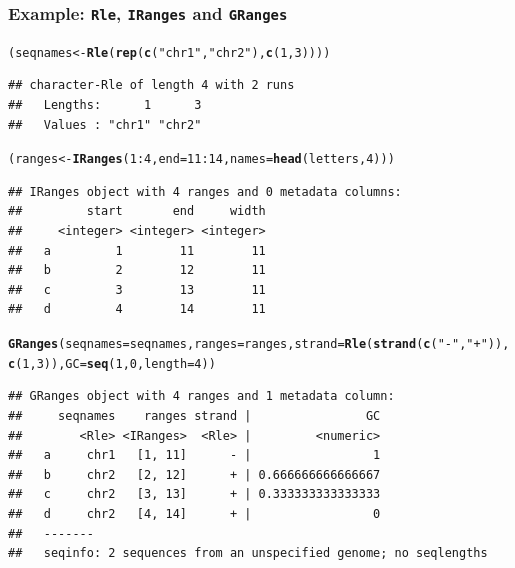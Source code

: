 \documentclass{beamer}\usepackage[]{graphicx}\usepackage[]{color}
\makeatletter
\newcommand{\hlnum}[1]{\textcolor[rgb]{0.686,0.059,0.569}{#1}}%
\newcommand{\hlstr}[1]{\textcolor[rgb]{0.192,0.494,0.8}{#1}}%
\newcommand{\hlopt}[1]{\textcolor[rgb]{0,0,0}{#1}}%
\newcommand{\hlstd}[1]{\textcolor[rgb]{0.345,0.345,0.345}{#1}}%
\newcommand{\hlkwb}[1]{\textcolor[rgb]{0.69,0.353,0.396}{#1}}%
\newcommand{\hlkwc}[1]{\textcolor[rgb]{0.333,0.667,0.333}{#1}}%
\newcommand{\hlkwd}[1]{\textcolor[rgb]{0.737,0.353,0.396}{\textbf{#1}}}%
\newenvironment{kframe}{%
 \def\at@end@of@kframe{}%
 \ifinner\ifhmode%
  \def\at@end@of@kframe{\end{minipage}}%
  \begin{minipage}{\columnwidth}%
 \fi\fi%
 \def\FrameCommand##1{\hskip\@totalleftmargin \hskip-\fboxsep
 \colorbox{shadecolor}{##1}\hskip-\fboxsep
     \hskip-\linewidth \hskip-\@totalleftmargin \hskip\columnwidth}%
 \MakeFramed {\advance\hsize-\width
   \@totalleftmargin\z@ \linewidth\hsize
   \@setminipage}}%
 {\par\unskip\endMakeFramed%
 \at@end@of@kframe}
\newenvironment{knitrout}{}{} %
\newcommand{\Rcode}[1]{\texttt{#1}}
\newcommand{\Robject}[1]{\Rcode{#1}}
\makeatother
\begin{document}
\begin{frame}[fragile]
  \frametitle{Example: \Robject{Rle}, \Robject{IRanges} and
    \Robject{GRanges}}
\begin{knitrout}\tiny
{}\color{fgcolor}\begin{kframe}
\begin{alltt}
\hlstd{(seqnames} \hlkwb{<-} \hlkwd{Rle}\hlstd{(}\hlkwd{rep}\hlstd{(}\hlkwd{c}\hlstd{(}\hlstr{"chr1"}\hlstd{,} \hlstr{"chr2"}\hlstd{),} \hlkwd{c}\hlstd{(}\hlnum{1}\hlstd{,} \hlnum{3}\hlstd{))))}
\end{alltt}
\begin{verbatim}
## character-Rle of length 4 with 2 runs
##   Lengths:      1      3
##   Values : "chr1" "chr2"
\end{verbatim}
\begin{alltt}
\hlstd{(ranges} \hlkwb{<-} \hlkwd{IRanges}\hlstd{(}\hlnum{1}\hlopt{:}\hlnum{4}\hlstd{,} \hlkwc{end} \hlstd{=} \hlnum{11}\hlopt{:}\hlnum{14}\hlstd{,} \hlkwc{names} \hlstd{=} \hlkwd{head}\hlstd{(letters,} \hlnum{4}\hlstd{)))}
\end{alltt}
\begin{verbatim}
## IRanges object with 4 ranges and 0 metadata columns:
##         start       end     width
##     <integer> <integer> <integer>
##   a         1        11        11
##   b         2        12        11
##   c         3        13        11
##   d         4        14        11
\end{verbatim}
\begin{alltt}
\hlkwd{GRanges}\hlstd{(}\hlkwc{seqnames} \hlstd{= seqnames,} \hlkwc{ranges} \hlstd{= ranges,} \hlkwc{strand} \hlstd{=} \hlkwd{Rle}\hlstd{(}\hlkwd{strand}\hlstd{(}\hlkwd{c}\hlstd{(}\hlstr{"-"}\hlstd{,} \hlstr{"+"}\hlstd{)),}
    \hlkwd{c}\hlstd{(}\hlnum{1}\hlstd{,} \hlnum{3}\hlstd{)),} \hlkwc{GC} \hlstd{=} \hlkwd{seq}\hlstd{(}\hlnum{1}\hlstd{,} \hlnum{0}\hlstd{,} \hlkwc{length} \hlstd{=} \hlnum{4}\hlstd{))}
\end{alltt}
\begin{verbatim}
## GRanges object with 4 ranges and 1 metadata column:
##     seqnames    ranges strand |                GC
##        <Rle> <IRanges>  <Rle> |         <numeric>
##   a     chr1   [1, 11]      - |                 1
##   b     chr2   [2, 12]      + | 0.666666666666667
##   c     chr2   [3, 13]      + | 0.333333333333333
##   d     chr2   [4, 14]      + |                 0
##   -------
##   seqinfo: 2 sequences from an unspecified genome; no seqlengths
\end{verbatim}
\end{kframe}
\end{knitrout}
\end{frame}
\end{document}

